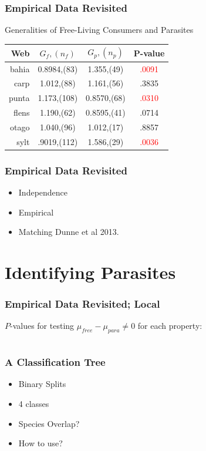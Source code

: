 \documentclass{beamer}
\begin{document}
\begin{frame}
\frametitle{Empirical Data Revisited}
Generalities of Free-Living Consumers and Parasites
\begin{tabular}{|r| c c |c|}
\hline
Web& $G_{f},(n_f)$ & $G_p,(n_p)$ &  P-value\\
\hline
bahia&0.8984,(83)&1.355,(49)&\textcolor{red}{.0091}\\
carp&1.012,(88)&1.161,(56)&.3835\\
punta&1.173,(108)&0.8570,(68)&\textcolor{red}{.0310}\\
flens&1.190,(62)&0.8595,(41)&.0714\\
otago&1.040,(96)&1.012,(17)&.8857\\
sylt&.9019,(112)&1.586,(29)&\textcolor{red}{.0036}\\
\hline
\end{tabular}
\end{frame}

\begin{frame}
\frametitle{Empirical Data Revisited}
\begin{itemize}[<+->]
\item Independence
\item Empirical
\item Matching Dunne et al 2013.
\end{itemize}
\end{frame}

\section{Identifying Parasites}

\begin{frame}
\frametitle{Empirical Data Revisited; Local}
$P$-values for testing $\mu_{free} - \mu_{para}\neq0$ for each property:\vspace{.25in}

\tiny{
\begin{tabular}{|r| c c c c c c|}
\hline

\hline
\end{tabular}}
\end{frame}

\begin{frame}
\frametitle{A Classification Tree}
\begin{itemize}[<+->]
\item Binary Splits
\item 4 classes
\item Species Overlap?
\item How to use?
\end{itemize}
\end{frame}
\end{document}
